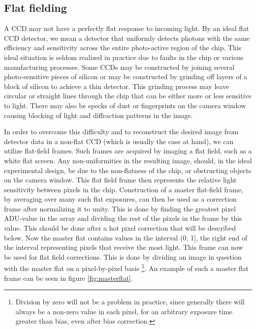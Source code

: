 \documentclass[../main.tex]{subfiles}
\begin{document}
	\subsection{Flat fielding}\label{sec:flat}
	A CCD may not have a perfectly flat response to incoming light. By an ideal flat CCD detector, we mean a detector that uniformly detects photons with the same efficiency and sensitivity across the entire photo-active region of the chip. This ideal situation is seldom realized in practice due to faults in the chip or various manufacturing processes. Some CCDs may be constructed by joining several photo-sensitive pieces of silicon or may be constructed by grinding off layers of a block of silicon to achieve a thin detector. This grinding process may leave circular or straight lines through the chip that can be either more or less sensitive to light. There may also be specks of dust or fingerprints on the camera window causing blocking of light and diffraction patterns in the image.
	
	In order to overcome this difficulty and to reconstruct the desired image from detector data in a non-flat CCD (which is usually the case at hand), we can utilize flat-field frames. Such frames are acquired by imaging a flat field, such as a white flat screen. Any non-uniformities in the resulting image, should, in the ideal experimental design, be due to the non-flatness of the chip, or obstructing objects on the camera window. This flat field frame then represents the relative light sensitivity between pixels in the chip. Construction of a master flat-field frame, by averaging over many such flat exposures, can then be used as a correction frame after normalizing it to unity. This is done by finding the greatest pixel ADU-value in the array and dividing the rest of the pixels in the frame by this value. This should be done after a hot pixel correction that will be described below. Now the master flat contains values in the interval (0, 1], the right end of the interval representing pixels that receive the most light. This frame can now be used for flat field corrections. This is done by dividing an image in question with the master flat on a pixel-by-pixel basis \footnote{Division by zero will not be a problem in practice, since generally there will always be a non-zero value in each pixel, for an arbitrary exposure time greater than bias, even after bias correction.}. An example of such a master flat frame can be seen in figure \ref{fig:masterflat}.
	
\end{document}
